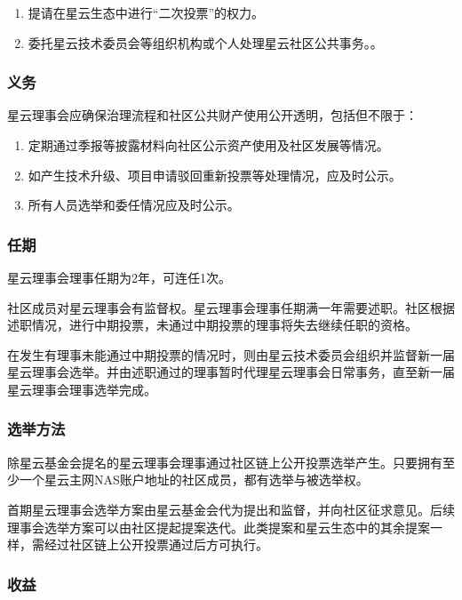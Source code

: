 \begin{enumerate}
	\item 提请在星云生态中进行“二次投票”的权力。
	\item 委托星云技术委员会等组织机构或个人处理星云社区公共事务。。
\end{enumerate}

\subsubsection{义务}

星云理事会应确保治理流程和社区公共财产使用公开透明，包括但不限于：

\begin{enumerate}
	\item 定期通过季报等披露材料向社区公示资产使用及社区发展等情况。
	\item 如产生技术升级、项目申请驳回重新投票等处理情况，应及时公示。
	\item 所有人员选举和委任情况应及时公示。
\end{enumerate}

\subsubsection{任期}

星云理事会理事任期为2年，可连任1次。

社区成员对星云理事会有监督权。星云理事会理事任期满一年需要述职。社区根据述职情况，进行中期投票，未通过中期投票的理事将失去继续任职的资格。

在发生有理事未能通过中期投票的情况时，则由星云技术委员会组织并监督新一届星云理事会选举。并由述职通过的理事暂时代理星云理事会日常事务，直至新一届星云理事会理事选举完成。

\subsubsection{选举方法}

除星云基金会提名的星云理事会理事通过社区链上公开投票选举产生。只要拥有至少一个星云主网NAS账户地址的社区成员，都有选举与被选举权。

首期星云理事会选举方案由星云基金会代为提出和监督，并向社区征求意见。后续理事会选举方案可以由社区提起提案迭代。此类提案和星云生态中的其余提案一样，需经过社区链上公开投票通过后方可执行。


\subsubsection{收益}

